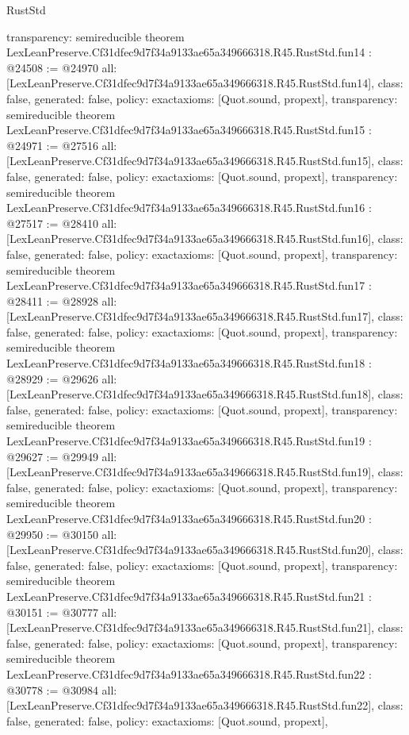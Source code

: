 \begin{lexlean}{RustStd}
\begin{coremodule}
{  transparency: semireducible
}
theorem LexLeanPreserve.Cf31dfec9d7f34a9133ae65a349666318.R45.RustStd.fun14 : @24508 := @24970 {
  all: [LexLeanPreserve.Cf31dfec9d7f34a9133ae65a349666318.R45.RustStd.fun14],
  class: false,
  generated: false,
  policy: exact{axioms: [Quot.sound, propext]},
  transparency: semireducible
}
theorem LexLeanPreserve.Cf31dfec9d7f34a9133ae65a349666318.R45.RustStd.fun15 : @24971 := @27516 {
  all: [LexLeanPreserve.Cf31dfec9d7f34a9133ae65a349666318.R45.RustStd.fun15],
  class: false,
  generated: false,
  policy: exact{axioms: [Quot.sound, propext]},
  transparency: semireducible
}
theorem LexLeanPreserve.Cf31dfec9d7f34a9133ae65a349666318.R45.RustStd.fun16 : @27517 := @28410 {
  all: [LexLeanPreserve.Cf31dfec9d7f34a9133ae65a349666318.R45.RustStd.fun16],
  class: false,
  generated: false,
  policy: exact{axioms: [Quot.sound, propext]},
  transparency: semireducible
}
theorem LexLeanPreserve.Cf31dfec9d7f34a9133ae65a349666318.R45.RustStd.fun17 : @28411 := @28928 {
  all: [LexLeanPreserve.Cf31dfec9d7f34a9133ae65a349666318.R45.RustStd.fun17],
  class: false,
  generated: false,
  policy: exact{axioms: [Quot.sound, propext]},
  transparency: semireducible
}
theorem LexLeanPreserve.Cf31dfec9d7f34a9133ae65a349666318.R45.RustStd.fun18 : @28929 := @29626 {
  all: [LexLeanPreserve.Cf31dfec9d7f34a9133ae65a349666318.R45.RustStd.fun18],
  class: false,
  generated: false,
  policy: exact{axioms: [Quot.sound, propext]},
  transparency: semireducible
}
theorem LexLeanPreserve.Cf31dfec9d7f34a9133ae65a349666318.R45.RustStd.fun19 : @29627 := @29949 {
  all: [LexLeanPreserve.Cf31dfec9d7f34a9133ae65a349666318.R45.RustStd.fun19],
  class: false,
  generated: false,
  policy: exact{axioms: [Quot.sound, propext]},
  transparency: semireducible
}
theorem LexLeanPreserve.Cf31dfec9d7f34a9133ae65a349666318.R45.RustStd.fun20 : @29950 := @30150 {
  all: [LexLeanPreserve.Cf31dfec9d7f34a9133ae65a349666318.R45.RustStd.fun20],
  class: false,
  generated: false,
  policy: exact{axioms: [Quot.sound, propext]},
  transparency: semireducible
}
theorem LexLeanPreserve.Cf31dfec9d7f34a9133ae65a349666318.R45.RustStd.fun21 : @30151 := @30777 {
  all: [LexLeanPreserve.Cf31dfec9d7f34a9133ae65a349666318.R45.RustStd.fun21],
  class: false,
  generated: false,
  policy: exact{axioms: [Quot.sound, propext]},
  transparency: semireducible
}
theorem LexLeanPreserve.Cf31dfec9d7f34a9133ae65a349666318.R45.RustStd.fun22 : @30778 := @30984 {
  all: [LexLeanPreserve.Cf31dfec9d7f34a9133ae65a349666318.R45.RustStd.fun22],
  class: false,
  generated: false,
  policy: exact{axioms: [Quot.sound, propext]},
}
\end{coremodule}
\end{lexlean}
